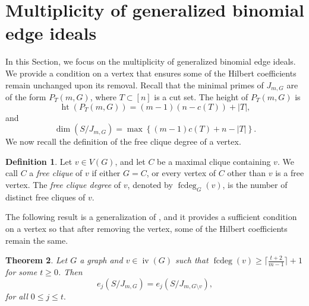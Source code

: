 \documentclass[12pt,reqno]{amsart}
\newcommand \iv{\operatorname{iv}}
\DeclareMathOperator{\fcdeg}{fcdeg}
\DeclareMathOperator{\height}{ht}
\theoremstyle{plain}
\newtheorem{theorem}{Theorem}[section]
\theoremstyle{definition}
\newtheorem{definition}[theorem]{Definition}
\begin{document}
\section{Multiplicity of generalized binomial edge ideals}\label{sec: multiplicity}
In this Section, we focus on the multiplicity of generalized binomial edge ideals. We provide a condition on a vertex that ensures some of the Hilbert coefficients remain unchanged upon its removal. Recall that the minimal primes of $J_{m, G}$ are of the form $P_{T}(m,G)$, where $T\subset[n]$ is a cut set. The height of $P_T(m,G)$ is $$\height(P_{T}(m,G))=(m-1)(n-c(T))+|T|,$$ 
and $$\dim(S/J_{m,G})=\max\left\{(m-1)c(T)+n-|T|\right\}.$$
We now recall the definition of the free clique degree of a vertex.
\begin{definition}\cite[Definition 3.2]{KKP-Hilbert-coefficients-regularity-BEI}
    Let $v \in V(G)$, and let $C$ be a maximal clique containing $v$. We call $C$ a \emph{free clique} of $v$ if either $G = C$, or every vertex of $C$ other than $v$ is a free vertex. The \emph{free clique degree} of $v$, denoted by $\fcdeg_G(v)$, is the number of distinct free cliques of $v$.

    The following result is a generalization of \cite[Theorem 3.3]{KKP-Hilbert-coefficients-regularity-BEI}, and it provides a sufficient condition on a vertex so that after removing the vertex, some of the Hilbert coefficients remain the same.
\end{definition}
 \begin{theorem}\label{thm: fcdeg condition to remove vertex keeping Hilbert coefficients same}
    Let $G$ a graph and $v\in \iv(G)$ such that $\fcdeg(v)\geq \lceil\frac{t+2}{m-1}\rceil+1$ for some $t\geq 0$. Then $$e_j(S/J_{m,G})=e_j(S/J_{m,G\setminus v}),$$ for all $0\leq j\leq t.$
\end{theorem}
\end{document}
